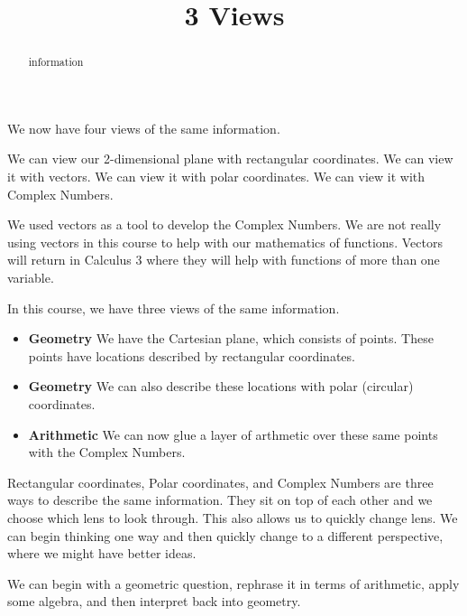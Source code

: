 \documentclass{ximera}
\title{3 Views}
\begin{document}
\begin{abstract}
information
\end{abstract}
\maketitle






We now have four views of the same information.

We can view our 2-dimensional plane with rectangular coordinates. We can view it with vectors. We can view it with polar coordinates. We can view it with Complex Numbers.


We used vectors as a tool to develop the Complex Numbers.  We are not really using vectors in this course to help with our mathematics of functions. Vectors will return in Calculus 3 where they will help with functions of more than one variable.




In this course, we have three views of the same information.



\begin{itemize}
\item \textbf{\textcolor{purple!85!blue}{Geometry}} We have the Cartesian plane, which consists of points.  These points have locations described by rectangular coordinates. 

\item \textbf{\textcolor{purple!85!blue}{Geometry}} We can also describe these locations with polar (circular) coordinates. 

\item \textbf{\textcolor{purple!85!blue}{Arithmetic}} We can now glue a layer of arthmetic over these same points with the Complex Numbers.
\end{itemize}





Rectangular coordinates, Polar coordinates, and Complex Numbers are three ways to describe the same information.  They sit on top of each other and we choose which lens to look through.  This also allows us to quickly change lens.  We can begin thinking one way and then quickly change to a different perspective, where we might have better ideas. 

We can begin with a geometric question, rephrase it in terms of arithmetic, apply some algebra, and then interpret back into geometry. 
\end{document}
